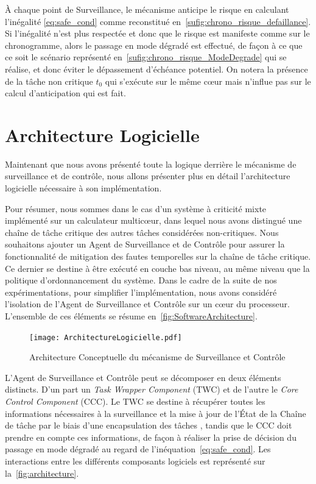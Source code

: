 \documentclass[french, a4paper, 11pt, twoside, pdftex]{StyleThese}
\begin{document}
     À chaque point de Surveillance, le mécanisme anticipe le risque en calculant l'inégalité \ref{eq:safe_cond} comme reconstitué en~\autoref{sufig:chrono_risque_defaillance}. Si l'inégalité n'est plus respectée et donc que le risque est manifeste comme sur le chronogramme, alors le passage en mode dégradé est effectué, de façon à ce que ce soit le scénario représenté en~\autoref{sufig:chrono_risque_ModeDegrade} qui se réalise, et donc éviter le dépassement d'échéance potentiel. On notera la présence de la tâche non critique $t_0$ qui s'exécute sur le même cœur mais n'influe pas sur le calcul d'anticipation qui est fait.
	
	\section{Architecture Logicielle}
	
	Maintenant que nous avons présenté toute la logique derrière le mécanisme de surveillance et de contrôle, nous allons présenter plus en détail l'architecture logicielle nécessaire à son implémentation.
	
	Pour résumer, nous sommes dans le cas d'un système à criticité mixte implémenté sur un calculateur multicœur, dans lequel nous avons distingué une chaîne de tâche critique des autres tâches considérées non-critiques. Nous souhaitons ajouter un Agent de Surveillance et de Contrôle pour assurer la fonctionnalité de mitigation des fautes temporelles sur la chaîne de tâche critique. Ce dernier se destine à être exécuté en couche bas niveau, au même niveau que la politique d'ordonnancement du système. Dans le cadre de la suite de nos expérimentations, pour simplifier l'implémentation, nous avons considéré l'isolation de l'Agent de Surveillance et Contrôle sur un cœur du processeur. L'ensemble de ces éléments se résume en~\autoref{fig:SoftwareArchitecture}.

	\begin{figure}[ht]
        \centering
        \texttt{[image: ArchitectureLogicielle.pdf]}
        \caption{Architecture Conceptuelle du mécanisme de Surveillance et Contrôle} \label{fig:SoftwareArchitecture}
	\end{figure}

	L'Agent de Surveillance et Contrôle peut se décomposer en deux éléments distincts. D'un part un \emph{Task Wrapper Component} (TWC) et de l'autre le \emph{Core Control Component} (CCC). Le TWC se destine à récupérer toutes les informations nécessaires à la surveillance et la mise à jour de l'État de la Chaîne de tâche par le biais d'une encapsulation des tâches , tandis que le CCC doit prendre en compte ces informations, de façon à réaliser la prise de décision du passage en mode dégradé au regard de l'inéquation~\ref{eq:safe_cond}. Les interactions entre les différents composants logiciels est représenté sur la~\autoref{fig:architecture}. 
	
\end{document}
